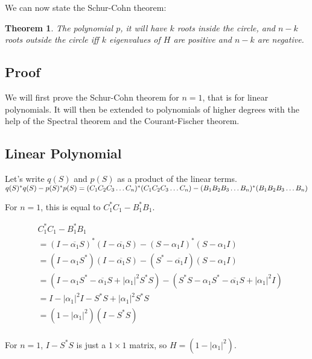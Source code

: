 \documentclass[twofold]{article}
\newcommand*\conj[1]{\overline{#1}}
\newcommand*\adj[1]{#1^*}
\newcommand*\abs[1]{\left \vert #1 \right\vert}
\theoremstyle{plain}
\newtheorem{theorem}{Theorem}
\theoremstyle{definition}
\theoremstyle{remark}
\begin{document}
We can now state the Schur-Cohn theorem:

\begin{theorem}The polynomial \(p\), it will have \(k\) roots inside the circle, and \(n-k\) roots outside the circle iff \(k\) eigenvalues of \(H\) are positive and \(n-k\) are negative. \end{theorem}

\subsection{Proof}

We will first prove the Schur-Cohn theorem for \(n =1\), that is for linear polynomials. It will then be extended to polynomials of higher degrees with the help of the Spectral theorem and the Courant-Fischer theorem. 


\subsection{Linear Polynomial}


Let's write \(q(S)\) and \(p(S)\) as a product of the linear terms. \(\adj{q(S)} q(S) - \adj{p(S)} p(S) \\= \adj{(C_1C_2C_3 \ldots C_n)}(C_1C_2C_3\ldots C_n) - \adj{(B_1B_2B_3\ldots B_n)} (B_1B_2B_3\ldots B_n)\)

For \(n =1\), this is equal to \(\adj{C_1} C_1 - \adj{B_1} B_1\). 

\begin{equation*}
\begin{split}
&    \adj{C_1}C_1 - \adj{B_1} B_1 \\
 & = \adj{(I - \conj{\alpha_1}S)} (I - \conj{\alpha_1}S) - \adj{(S - \alpha_1 I)} (S - \alpha_1 I) \\
& = (I - \alpha_1\adj{S}) (I - \conj{\alpha_1}S) - (\adj{S} - \conj{\alpha_1} I) (S - \alpha_1 I) \\
 & = (I - \alpha_1\adj{S} - \conj{\alpha_1}S + \abs{\alpha_1}^2 \adj{S} S) - (\adj{S} S - \alpha_1 \adj{S} - \conj{\alpha_1} S + \abs{\alpha_1}^2I)\\
& = I - \abs{\alpha_1}^2 I - \adj{S} S + \abs{\alpha_1}^2 \adj{S} S \\
& = (1 - \abs{\alpha_1}^2) (I - \adj{S} S) \\
\end{split}
\end{equation*}

For \(n = 1\), \(I - \adj{S}S\) is just a \(1 \times 1\) matrix, so \(H = (1 - \abs{\alpha_1}^2)\). 
\end{document}
